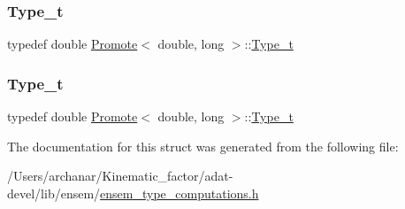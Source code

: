 \subsubsection{\texorpdfstring{Type\_t}{Type\_t}\hspace{0.1cm}{\footnotesize\ttfamily [2/3]}}
{\footnotesize\ttfamily typedef double \mbox{\hyperlink{structPromote}{Promote}}$<$ double, long $>$\+::\mbox{\hyperlink{structPromote_3_01double_00_01long_01_4_a7c2dadf6e46df10fbef16312d46706ab}{Type\+\_\+t}}}

\mbox{\label{structPromote_3_01double_00_01long_01_4_a7c2dadf6e46df10fbef16312d46706ab}} 
\subsubsection{\texorpdfstring{Type\_t}{Type\_t}\hspace{0.1cm}{\footnotesize\ttfamily [3/3]}}
{\footnotesize\ttfamily typedef double \mbox{\hyperlink{structPromote}{Promote}}$<$ double, long $>$\+::\mbox{\hyperlink{structPromote_3_01double_00_01long_01_4_a7c2dadf6e46df10fbef16312d46706ab}{Type\+\_\+t}}}



The documentation for this struct was generated from the following file\+:\begin{DoxyCompactItemize}
\item 
/\+Users/archanar/\+Kinematic\+\_\+factor/adat-\/devel/lib/ensem/\mbox{\hyperlink{adat-devel_2lib_2ensem_2ensem__type__computations_8h}{ensem\+\_\+type\+\_\+computations.\+h}}\end{DoxyCompactItemize}
